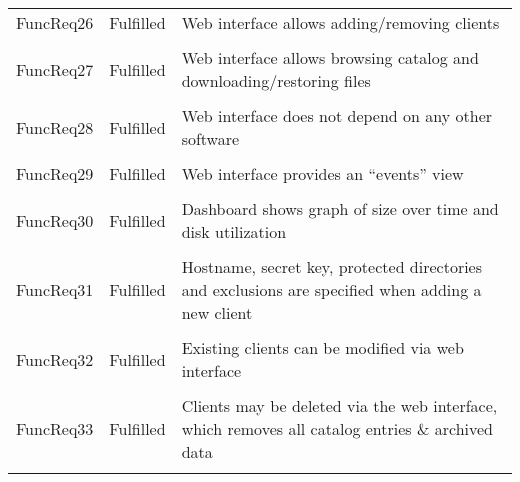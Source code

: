 \begin{longtable}{ l l p{5cm} }
    FuncReq26           & Fulfilled                 & Web interface allows
                                                      adding/removing
                                                      clients
    \\ \\
    FuncReq27           & Fulfilled                 & Web interface allows
                                                      browsing catalog and
                                                      downloading/restoring
                                                      files
    \\ \\
    FuncReq28           & Fulfilled                 & Web interface does not
                                                      depend on any other
                                                      software
    \\ \\
    FuncReq29           & Fulfilled                 & Web interface provides an
                                                      ``events'' view
    \\ \\
    FuncReq30           & Fulfilled                 & Dashboard shows graph of
                                                      size over time and disk
                                                      utilization
    \\ \\
    FuncReq31           & Fulfilled                 & Hostname, secret key,
                                                      protected directories and
                                                      exclusions are specified
                                                      when adding a new client
    \\ \\
    FuncReq32           & Fulfilled                 & Existing clients can be
                                                      modified via web
                                                      interface
    \\ \\
    FuncReq33           & Fulfilled                 & Clients may be deleted
                                                      via the web interface,
                                                      which removes all catalog
                                                      entries \& archived data
    \\ \\

\end{longtable}

